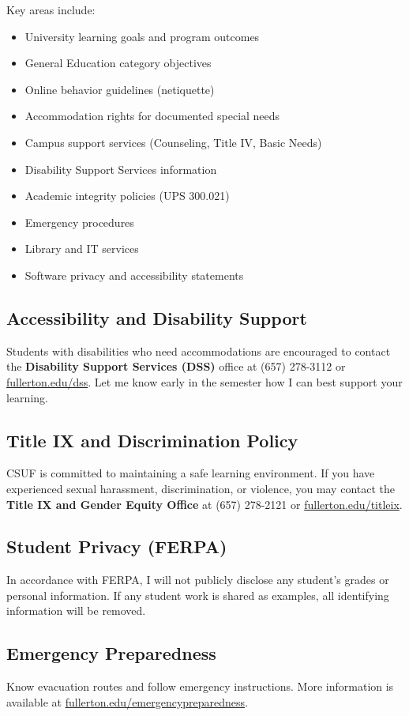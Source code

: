 \documentclass[12pt]{article}
\begin{document}
Key areas include:
\begin{itemize}
\item University learning goals and program outcomes
\item General Education category objectives
\item Online behavior guidelines (netiquette)
\item Accommodation rights for documented special needs
\item Campus support services (Counseling, Title IV, Basic Needs)
\item Disability Support Services information
\item Academic integrity policies (UPS 300.021)
\item Emergency procedures
\item Library and IT services
\item Software privacy and accessibility statements
\end{itemize}

\subsection*{Accessibility and Disability Support}
Students with disabilities who need accommodations are encouraged to contact the \textbf{Disability Support Services (DSS)} office at (657) 278-3112 or \href{https://www.fullerton.edu/dss}{fullerton.edu/dss}. Let me know early in the semester how I can best support your learning.

\subsection*{Title IX and Discrimination Policy}
CSUF is committed to maintaining a safe learning environment. If you have experienced sexual harassment, discrimination, or violence, you may contact the \textbf{Title IX and Gender Equity Office} at (657) 278-2121 or \href{https://www.fullerton.edu/titleix}{fullerton.edu/titleix}.

\subsection*{Student Privacy (FERPA)}
In accordance with FERPA, I will not publicly disclose any student's grades or personal information. If any student work is shared as examples, all identifying information will be removed.

\subsection*{Emergency Preparedness}
Know evacuation routes and follow emergency instructions. More information is available at \href{https://www.fullerton.edu/emergencypreparedness}{fullerton.edu/emergencypreparedness}.
\end{document}
